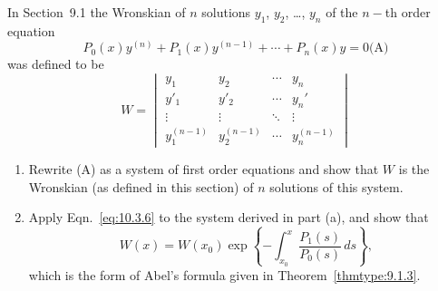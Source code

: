 \documentclass{ximera}
\begin{document}
\begin{problem}\label{exer:10.3.3}
In Section~9.1 the Wronskian of $n$
solutions $y_1$, $y_2$, \dots, $y_n$  of the $n-$th order
equation
$$
P_0(x)y^{(n)}+P_1(x)y^{(n-1)}+\cdots+P_n(x)y=0
\text{(A)}
$$
was defined to be
$$W=\begin{vmatrix}
           y_1&y_2&\cdots&y_n \\
y'_1&y'_2&\cdots&y_n'\\
\vdots&\vdots&\ddots&\vdots\\
y_1^{(n-1)}&y_2^{(n-1)}&\cdots&y_n^{(n-1)}
         \end{vmatrix}$$


\begin{enumerate}
\item %
Rewrite (A) as a system of first order equations and
show that $W$ is the Wronskian (as defined in this section) of $n$
solutions of this system.
\item %
Apply Eqn.~\ref{eq:10.3.6} to the system  derived in part (a), and
show that
$$
W(x)=W(x_0)\exp\left\{-\int^x_{x_0}\frac{P_1(s)}{ P_0(s)}\,
ds\right\},
$$
which is the form of Abel's formula given in
Theorem~\ref{thmtype:9.1.3}.
\end{enumerate}

\end{problem}
\end{document}
